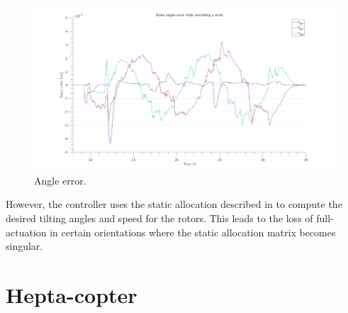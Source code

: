 \begin{figure}[!ht]
  \centering
  \includegraphics[width=\linewidth]{images/Voliro_circle_angle.jpg}
  \caption{Angle error.}
  \label{fig:Voliro_angle_error_circle}
\end{figure}

However, the controller uses
the static allocation described in  to compute the desired
tilting angles and speed for the rotors. This leads to the loss of full-actuation in
certain orientations where the static allocation matrix becomes singular.

\section{Hepta-copter}
\label{sec:hepta_copter_sim}
